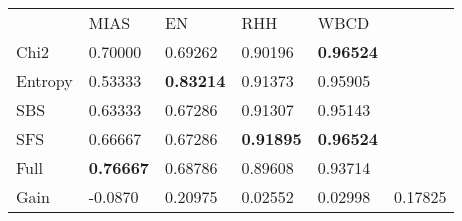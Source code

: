 \begin{tabular}{|l|l|l|l|l|l}
\cline{1-5}
        & MIAS              & EN                & RHH               & WBCD      &         \\
\cline{1-5}
Chi2    & 0.70000           & 0.69262           & 0.90196           & \textbf{0.96524}  &         \\
Entropy & 0.53333           & \textbf{0.83214}  & 0.91373           & 0.95905           &         \\
SBS     & 0.63333           & 0.67286           & 0.91307           & 0.95143           &         \\
SFS     & 0.66667           & 0.67286           & \textbf{0.91895}  & \textbf{0.96524}  &         \\
Full    & \textbf{0.76667}  & 0.68786           & 0.89608           & 0.93714           &         \\
\cline{1-5}
\cline{1-5}
Gain    & -0.0870           & 0.20975           & 0.02552           & 0.02998           & 0.17825 \\
\cline{1-5}
\end{tabular}
